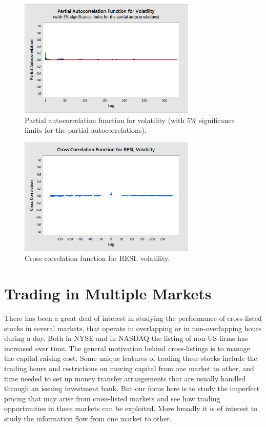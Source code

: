         \begin{figure}[H]
        \centering
        \includegraphics[width=0.75\textwidth]{chapters/chapter_stat_ts/figures/funvol.png}
        \caption{Partial autocorrelation function for volatility (with 5\% significance limits for the partial autocorrelations). \label{fig:funvol}}
        \end{figure}
        
        \begin{figure}[H]
        \centering
        \includegraphics[width=0.75\textwidth]{chapters/chapter_stat_ts/figures/resivol.png}
        \caption{Cross correlation function for RESI, volatility. \label{fig:ccresi}}
        \end{figure}



\section{Trading in Multiple Markets}


There has been a great deal of interest in studying the performance of cross-listed stocks in several markets, that operate in overlapping or in non-overlapping hours during a day. Both in NYSE and in NASDAQ the listing of non-US firms has increased over time. The general motivation behind cross-listings is to manage the capital raising cost. Some unique features of trading these stocks include the trading hours and restrictions on moving capital from one market to other, and time needed to set up money transfer arrangements that are usually handled through an issuing investment bank. But our focus here is to study the imperfect pricing that may arise from cross-listed markets and see how trading opportunities in these markets can be exploited. More broadly it is of interest to study the information flow from one market to other.


